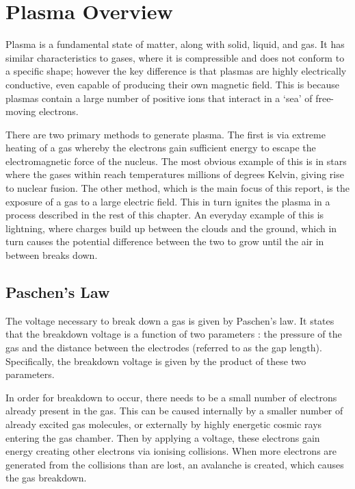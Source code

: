 \chapter{Plasma Overview}
\label{ch:plasma_overview}

Plasma is a fundamental state of matter, along with solid, liquid, and gas. It has similar characteristics to gases, where it is compressible and does not conform to a specific shape; however the key difference is that plasmas are highly electrically conductive, even capable of producing their own magnetic field. This is because plasmas contain a large number of positive ions that interact in a `sea' of free-moving electrons.

There are two primary methods to generate plasma. The first is via extreme heating of a gas whereby the electrons gain sufficient energy to escape the electromagnetic force of the nucleus. The most obvious example of this is in stars where the gases within reach temperatures millions of degrees Kelvin, giving rise to nuclear fusion. The other method, which is the main focus of this report, is the exposure of a gas to a large electric field. This in turn ignites the plasma in a process described in the rest of this chapter. An everyday example of this is lightning, where charges build up between the clouds and the ground, which in turn causes the potential difference between the two to grow until the air in between breaks down.

\section{Paschen's Law}
\label{sec:paschens_law}

The voltage necessary to break down a gas is given by Paschen's law. It states that the breakdown voltage is a function of two parameters \cite{Lieberman2005}: the pressure of the gas and the distance between the electrodes (referred to as the gap length). Specifically, the breakdown voltage is given by the product of these two parameters.

In order for breakdown to occur, there needs to be a small number of electrons already present in the gas. This can be caused internally by a smaller number of already excited gas molecules, or externally by highly energetic cosmic rays entering the gas chamber. Then by applying a voltage, these electrons gain energy creating other electrons via ionising collisions. When more electrons are generated from the collisions than are lost, an avalanche is created, which causes the gas breakdown.


